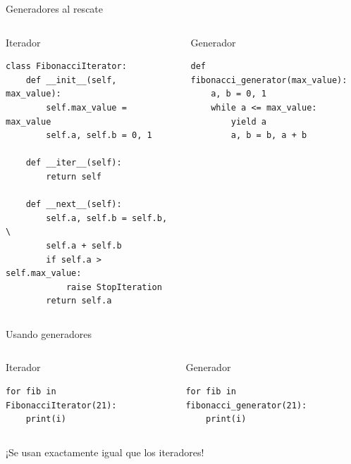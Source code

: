 \documentclass[12pt]{beamer}
\begin{document}
\begin{frame}[fragile]{Generadores al rescate}
\begin{columns}[T]

\begin{column}{.45\textwidth}
\begin{block}{Iterador}
\begin{verbatim}
class FibonacciIterator:
    def __init__(self, max_value):
        self.max_value = max_value
        self.a, self.b = 0, 1

    def __iter__(self):
        return self

    def __next__(self):
        self.a, self.b = self.b, \
        self.a + self.b
        if self.a > self.max_value:
            raise StopIteration
        return self.a
\end{verbatim}
\end{block} 
\end{column}

\begin{column}{.45\textwidth}
\begin{block}{Generador}
\begin{verbatim}
def fibonacci_generator(max_value):
    a, b = 0, 1
    while a <= max_value:
        yield a
        a, b = b, a + b
\end{verbatim}
\end{block}
\end{column}

\end{columns}
\end{frame}

\begin{frame}[fragile]{Usando generadores}
\begin{columns}[T]

\begin{column}{.45\textwidth}
\begin{block}{Iterador}
\begin{verbatim}
for fib in FibonacciIterator(21):
    print(i)
\end{verbatim}
\end{block} 
\end{column}

\begin{column}{.45\textwidth}
\begin{block}{Generador}
\begin{verbatim}
for fib in fibonacci_generator(21):
    print(i)
\end{verbatim}
\end{block}
\end{column}
  
\end{columns} 

\begin{center}
    ¡Se usan exactamente igual que los iteradores!
\end{center}
\end{frame}
\end{document}
